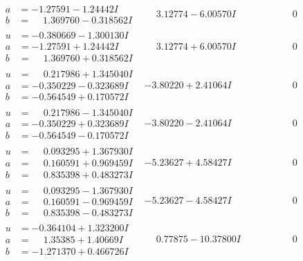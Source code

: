 \documentclass[1p]{elsarticle_modified}
\theoremstyle{definition}
\begin{document}
$$\begin{array}{c|c|c}
\begin{aligned}
a &= -1.27591 - 1.24442 I \\
b &= \phantom{-}1.369760 - 0.318562 I\end{aligned}
 & \phantom{-}3.12774 - 6.00570 I & \phantom{-0.000000 } 0 \\ \hline\begin{aligned}
u &= -0.380669 - 1.300130 I \\
a &= -1.27591 + 1.24442 I \\
b &= \phantom{-}1.369760 + 0.318562 I\end{aligned}
 & \phantom{-}3.12774 + 6.00570 I & \phantom{-0.000000 } 0 \\ \hline\begin{aligned}
u &= \phantom{-}0.217986 + 1.345040 I \\
a &= -0.350229 - 0.323689 I \\
b &= -0.564549 + 0.170572 I\end{aligned}
 & -3.80220 + 2.41064 I & \phantom{-0.000000 } 0 \\ \hline\begin{aligned}
u &= \phantom{-}0.217986 - 1.345040 I \\
a &= -0.350229 + 0.323689 I \\
b &= -0.564549 - 0.170572 I\end{aligned}
 & -3.80220 - 2.41064 I & \phantom{-0.000000 } 0 \\ \hline\begin{aligned}
u &= \phantom{-}0.093295 + 1.367930 I \\
a &= \phantom{-}0.160591 + 0.969459 I \\
b &= \phantom{-}0.835398 + 0.483273 I\end{aligned}
 & -5.23627 + 4.58427 I & \phantom{-0.000000 } 0 \\ \hline\begin{aligned}
u &= \phantom{-}0.093295 - 1.367930 I \\
a &= \phantom{-}0.160591 - 0.969459 I \\
b &= \phantom{-}0.835398 - 0.483273 I\end{aligned}
 & -5.23627 - 4.58427 I & \phantom{-0.000000 } 0 \\ \hline\begin{aligned}
u &= -0.364104 + 1.323200 I \\
a &= \phantom{-}1.35385 + 1.40669 I \\
b &= -1.271370 + 0.466726 I\end{aligned}
 & \phantom{-}0.77875 - 10.37800 I & \phantom{-0.000000 } 0\\

\end{array}$$
\end{document}
